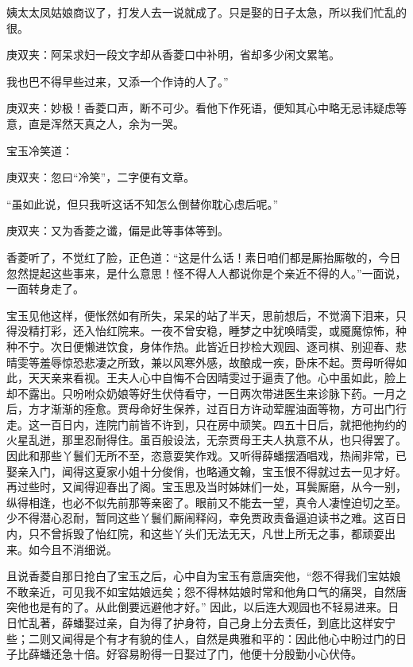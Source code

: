 \begin{parag}
姨太太凤姑娘商议了，打发人去一说就成了。只是娶的日子太急，所以我们忙乱的很。\begin{note}庚双夹：阿呆求妇一段文字却从香菱口中补明，省却多少闲文累笔。\end{note}我也巴不得早些过来，又添一个作诗的人了。”\begin{note}庚双夹：妙极！香菱口声，断不可少。看他下作死语，便知其心中略无忌讳疑虑等意，直是浑然天真之人，余为一哭。\end{note}宝玉冷笑道：\begin{note}庚双夹：忽曰“冷笑”，二字便有文章。\end{note}“虽如此说，但只我听这话不知怎么倒替你耽心虑后呢。”\begin{note}庚双夹：又为香菱之谶，偏是此等事体等到。\end{note}香菱听了，不觉红了脸，正色道：“这是什么话！素日咱们都是厮抬厮敬的，今日忽然提起这些事来，是什么意思！怪不得人人都说你是个亲近不得的人。”一面说，一面转身走了。
\end{parag}


\begin{parag}
    宝玉见他这样，便怅然如有所失，呆呆的站了半天，思前想后，不觉滴下泪来，只得没精打彩，还入怡红院来。一夜不曾安稳，睡梦之中犹唤晴雯，或魇魔惊怖，种种不宁。次日便懒进饮食，身体作热。此皆近日抄检大观园、逐司棋、别迎春、悲晴雯等羞辱惊恐悲凄之所致，兼以风寒外感，故酿成一疾，卧床不起。贾母听得如此，天天亲来看视。王夫人心中自悔不合因晴雯过于逼责了他。心中虽如此，脸上却不露出。只吩咐众奶娘等好生伏侍看守，一日两次带进医生来诊脉下药。一月之后，方才渐渐的痊愈。贾母命好生保养，过百日方许动荤腥油面等物，方可出门行走。这一百日内，连院门前皆不许到，只在房中顽笑。四五十日后，就把他拘约的火星乱迸，那里忍耐得住。虽百般设法，无奈贾母王夫人执意不从，也只得罢了。因此和那些丫鬟们无所不至，恣意耍笑作戏。又听得薛蟠摆酒唱戏，热闹非常，已娶亲入门，闻得这夏家小姐十分俊俏，也略通文翰，宝玉恨不得就过去一见才好。再过些时，又闻得迎春出了阁。宝玉思及当时姊妹们一处，耳鬓厮磨，从今一别，纵得相逢，也必不似先前那等亲密了。眼前又不能去一望，真令人凄惶迫切之至。少不得潜心忍耐，暂同这些丫鬟们厮闹释闷，幸免贾政责备逼迫读书之难。这百日内，只不曾拆毁了怡红院，和这些丫头们无法无天，凡世上所无之事，都顽耍出来。如今且不消细说。
\end{parag}


\begin{parag}
    且说香菱自那日抢白了宝玉之后，心中自为宝玉有意唐突他，“怨不得我们宝姑娘不敢亲近，可见我不如宝姑娘远矣；怨不得林姑娘时常和他角口气的痛哭，自然唐突他也是有的了。从此倒要远避他才好。” 因此，以后连大观园也不轻易进来。日日忙乱著，薛蟠娶过亲，自为得了护身符，自己身上分去责任，到底比这样安宁些；二则又闻得是个有才有貌的佳人，自然是典雅和平的：因此他心中盼过门的日子比薛蟠还急十倍。好容易盼得一日娶过了门，他便十分殷勤小心伏侍。
\end{parag}



